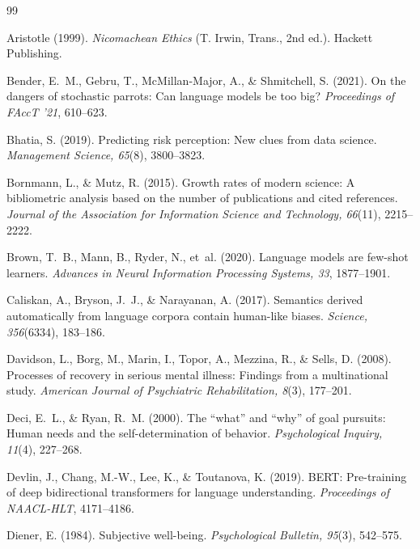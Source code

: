 \documentclass[12pt,a4paper]{article}
\begin{document}
\begin{thebibliography}{99}

Aristotle (1999).
\textit{Nicomachean Ethics} (T. Irwin, Trans., 2nd ed.).
Hackett Publishing.

Bender, E.~M., Gebru, T., McMillan-Major, A., \& Shmitchell, S. (2021).
On the dangers of stochastic parrots: Can language models be too big?
\textit{Proceedings of FAccT '21}, 610--623.

Bhatia, S. (2019).
Predicting risk perception: New clues from data science.
\textit{Management Science, 65}(8), 3800--3823.

Bornmann, L., \& Mutz, R. (2015).
Growth rates of modern science: A bibliometric analysis based on the number of publications and cited references.
\textit{Journal of the Association for Information Science and Technology, 66}(11), 2215--2222.

Brown, T.~B., Mann, B., Ryder, N., et~al. (2020).
Language models are few-shot learners.
\textit{Advances in Neural Information Processing Systems, 33}, 1877--1901.

Caliskan, A., Bryson, J.~J., \& Narayanan, A. (2017).
Semantics derived automatically from language corpora contain human-like biases.
\textit{Science, 356}(6334), 183--186.

Davidson, L., Borg, M., Marin, I., Topor, A., Mezzina, R., \& Sells, D. (2008).
Processes of recovery in serious mental illness: Findings from a multinational study.
\textit{American Journal of Psychiatric Rehabilitation, 8}(3), 177--201.

Deci, E.~L., \& Ryan, R.~M. (2000).
The ``what'' and ``why'' of goal pursuits: Human needs and the self-determination of behavior.
\textit{Psychological Inquiry, 11}(4), 227--268.

Devlin, J., Chang, M.-W., Lee, K., \& Toutanova, K. (2019).
BERT: Pre-training of deep bidirectional transformers for language understanding.
\textit{Proceedings of NAACL-HLT}, 4171--4186.

Diener, E. (1984).
Subjective well-being.
\textit{Psychological Bulletin, 95}(3), 542--575.


\end{thebibliography}
\end{document}
